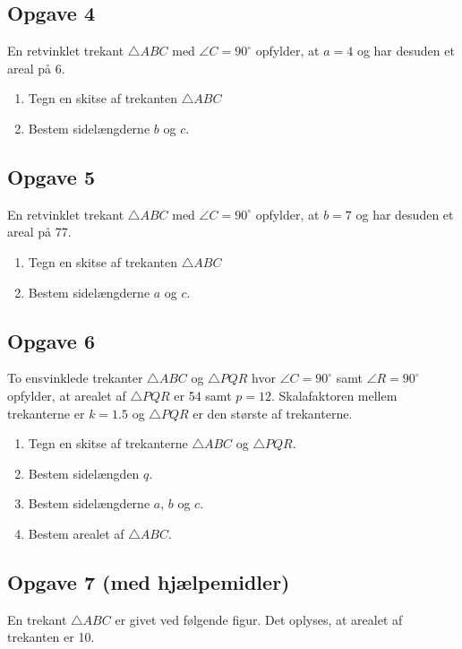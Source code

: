 \subsection*{Opgave 4}

En retvinklet trekant $\triangle ABC$ med $\angle C = 90^\circ$ opfylder, at $a = 4$ og har desuden et areal på 6.
\begin{enumerate}[label=\roman*)]
	\item Tegn en skitse af trekanten $\triangle ABC$
	\item Bestem sidelængderne $b$ og $c$. 
\end{enumerate}

\subsection*{Opgave 5}
En retvinklet trekant $\triangle ABC$ med $\angle C = 90^\circ$ opfylder, at $b = 7$ og har desuden et areal på 77.
\begin{enumerate}[label=\roman*)]
	\item Tegn en skitse af trekanten $\triangle ABC$
	\item Bestem sidelængderne $a$ og $c$. 
\end{enumerate}

\subsection*{Opgave 6}
To ensvinklede trekanter $\triangle ABC$ og $\triangle PQR$ hvor $\angle C = 90^\circ$ samt $\angle R = 90^\circ$ opfylder, at arealet af $\triangle PQR$ er 54 samt $p = 12$. Skalafaktoren mellem trekanterne er $k = 1.5$ og $\triangle PQR$ er den største af trekanterne. 
\begin{enumerate}[label=\roman*)]
	\item Tegn en skitse af trekanterne $\triangle ABC$ og $\triangle PQR$. 
	\item Bestem sidelængden $q$. 
	\item Bestem sidelængderne $a$, $b$ og $c$. 
	\item Bestem arealet af $\triangle ABC$. 
\end{enumerate}

\newpage
\subsection*{Opgave 7 (med hjælpemidler)}

En trekant $\triangle ABC$ er givet ved følgende figur. Det oplyses, at arealet af trekanten er 10.
\begin{center}
\end{center}

